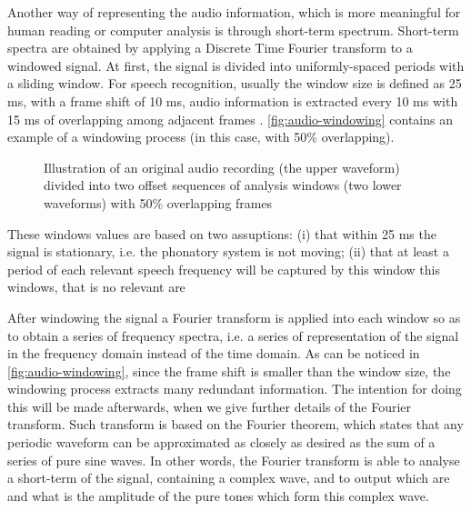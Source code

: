 Another way of representing the audio information, which is more meaningful for human reading
or computer analysis is through short-term spectrum. Short-term spectra are obtained by applying
a Discrete Time Fourier transform to a windowed signal. At first, the signal is divided
into uniformly-spaced periods with a sliding window. For speech recognition, usually the window size is defined as 25 ms, 
with a frame shift of 10 ms, audio information is extracted every 10 ms with 15 ms of overlapping
among adjacent frames \cite{Huang2001}. \autoref{fig:audio-windowing} contains an example of a windowing process (in this case, 
with 50\% overlapping).

\begin{figure}[!ht]
        \noindent{}
        \caption{Illustration of an original audio recording (the upper waveform) divided into two
offset sequences of analysis windows (two lower waveforms) with 50\% overlapping frames \cite{McLoughlin2009}}
        \label{fig:audio-windowing}
\end{figure}

These windows values are based on two assuptions: (i) that within 25 ms the signal is stationary, i.e.
the phonatory system is not moving; (ii) that at least a period of each relevant speech frequency will 
be captured by this window
this windows, that is no relevant are 

After windowing the signal a Fourier transform is applied into each window so as to obtain
a series of frequency spectra, i.e. a series of representation of the signal in the frequency domain instead of the time domain. As can be noticed in \autoref{fig:audio-windowing}, since the frame shift is smaller than the window size, the windowing process extracts many redundant information. The intention for doing this will be made afterwards, when we give further details of the Fourier transform. Such transform is based on the Fourier theorem, which states that any periodic waveform can be approximated as closely as desired as the sum of a series of pure sine waves. In other words, the Fourier transform is able to analyse a short-term of the signal, containing a complex wave, and to output which are and what is the amplitude of the pure tones which form this complex wave.

